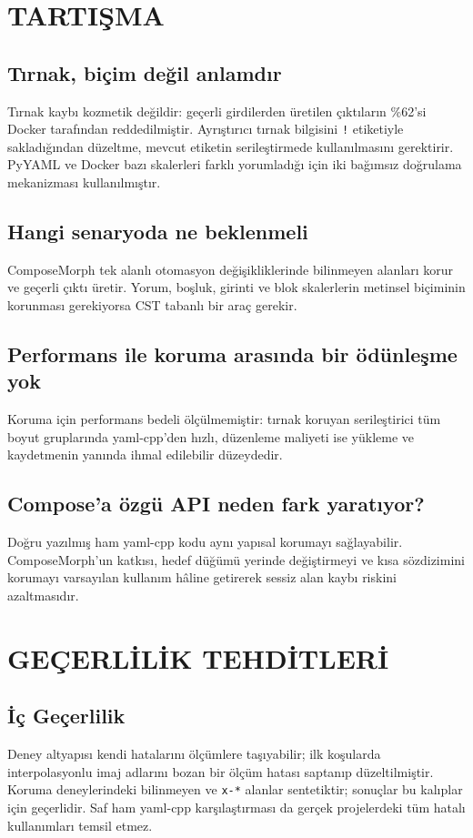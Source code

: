 \documentclass[12pt,a4paper]{article}
\begin{document}
\section{TARTIŞMA}
\label{sec:tartisma}

\subsection{Tırnak, biçim değil anlamdır}
Tırnak kaybı kozmetik değildir: geçerli girdilerden üretilen çıktıların
\%62'si Docker tarafından reddedilmiştir. Ayrıştırıcı tırnak bilgisini
\texttt{!} etiketiyle sakladığından düzeltme, mevcut etiketin
serileştirmede kullanılmasını gerektirir. PyYAML ve Docker bazı skalerleri
farklı yorumladığı için iki bağımsız doğrulama mekanizması kullanılmıştır.

\subsection{Hangi senaryoda ne beklenmeli}
ComposeMorph tek alanlı otomasyon değişikliklerinde bilinmeyen alanları
korur ve geçerli çıktı üretir. Yorum, boşluk, girinti ve blok skalerlerin
metinsel biçiminin korunması gerekiyorsa CST tabanlı bir araç gerekir.

\subsection{Performans ile koruma arasında bir ödünleşme yok}
Koruma için performans bedeli ölçülmemiştir: tırnak koruyan serileştirici
tüm boyut gruplarında yaml-cpp'den hızlı, düzenleme maliyeti ise yükleme ve
kaydetmenin yanında ihmal edilebilir düzeydedir.

\subsection{Compose'a özgü API neden fark yaratıyor?}
Doğru yazılmış ham yaml-cpp kodu aynı yapısal korumayı sağlayabilir.
ComposeMorph'un katkısı, hedef düğümü yerinde değiştirmeyi ve kısa
sözdizimini korumayı varsayılan kullanım hâline getirerek sessiz alan
kaybı riskini azaltmasıdır.

\section{GEÇERLİLİK TEHDİTLERİ}
\label{sec:gecerlilik}

\subsection{İç Geçerlilik}
Deney altyapısı kendi hatalarını ölçümlere taşıyabilir; ilk koşularda
interpolasyonlu imaj adlarını bozan bir ölçüm hatası saptanıp düzeltilmiştir.
Koruma deneylerindeki bilinmeyen ve \texttt{x-*} alanlar sentetiktir;
sonuçlar bu kalıplar için geçerlidir. Saf ham yaml-cpp karşılaştırması da
gerçek projelerdeki tüm hatalı kullanımları temsil etmez.
\end{document}
